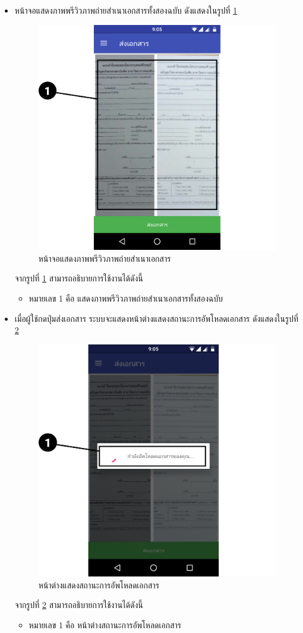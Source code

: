 \begin{enumerate}
\begin{itemize}
			\item หน้าจอแสดงภาพพรีวิวภาพถ่ายสำเนาเอกสารทั้งสองฉบับ ดังแสดงในรูปที่ \ref{Fig:submit4}
			\begin{figure}[H]
				\centering
				\includegraphics[width=0.5\columnwidth]{Figures/7/Manual/submit4}
				\caption{หน้าจอแสดงภาพพรีวิวภาพถ่ายสำเนาเอกสาร}
				\label{Fig:submit4}
			\end{figure}
			จากรูปที่ \ref{Fig:submit4} สามารถอธิบายการใช้งานได้ดังนี้
			\begin{itemize}[label={--}]
				\item หมายเลข 1 คือ แสดงภาพพรีวิวภาพถ่ายสำเนาเอกสารทั้งสองฉบับ 
			\end{itemize} 
			
			\item เมื่อผู้ใช้กดปุ่มส่งเอกสาร ระบบจะแสดงหน้าต่างแสดงสถานะการอัพโหลดเอกสาร ดังแสดงในรูปที่ \ref{Fig:submit5}
			\begin{figure}[H]
				\centering
				\includegraphics[width=0.5\columnwidth]{Figures/7/Manual/submit5}
				\caption{หน้าต่างแสดงสถานะการอัพโหลดเอกสาร}
				\label{Fig:submit5}
			\end{figure}
			จากรูปที่ \ref{Fig:submit5} สามารถอธิบายการใช้งานได้ดังนี้
			\begin{itemize}[label={--}]
				\item หมายเลข 1 คือ หน้าต่างสถานะการอัพโหลดเอกสาร 
			\end{itemize} 
		

\end{itemize}
\end{enumerate}
